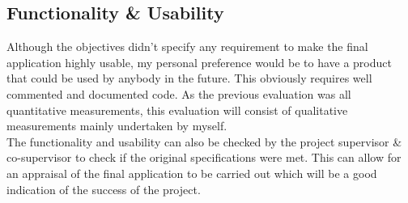 \documentclass[interim_report.tex]{subfiles}
\begin{document}
\subsection{Functionality \& Usability}
Although the objectives didn't specify any requirement to make the final application highly usable, my personal preference would be to have a product that could be used by anybody in the future. This obviously requires well commented and documented code. As the previous evaluation was all quantitative measurements, this evaluation will consist of qualitative measurements mainly undertaken by myself. \\
\newline
The functionality and usability can also be checked by the project supervisor \& co-supervisor to check if the original specifications were met. This can allow for an appraisal of the final application to be carried out which will be a good indication of the success of the project.
\end{document}
